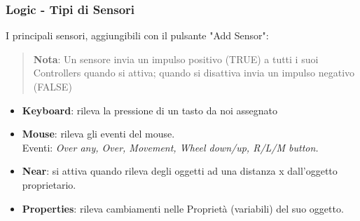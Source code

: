 \documentclass{beamer}
\begin{document}
		\begin{frame}
			\frametitle{Logic - Tipi di Sensori}
			I principali sensori, aggiungibili con il pulsante "Add Sensor":
			\begin{quote}
			\textcolor{BlenderOrange}{\textbf{Nota}: Un sensore invia un impulso positivo (TRUE) a tutti i suoi Controllers quando si attiva; quando si disattiva invia un impulso negativo (FALSE)}
			\end{quote}
			\begin{itemize}
				\item \textbf{Keyboard}: rileva la pressione di un tasto da noi assegnato %
				\item \textbf{Mouse}: rileva gli eventi del mouse. \\ {\footnotesize\hspace{1em}Eventi: \textit{Over any, Over, Movement, Wheel down/up, R/L/M button.}}
				\item \textbf{Near}: si attiva quando rileva degli oggetti ad una distanza x dall'oggetto proprietario.
				\item \textbf{Properties}: rileva cambiamenti nelle Proprietà (variabili) del suo oggetto.
			\end{itemize}
		\end{frame}	
		
\end{document}

